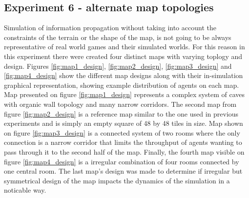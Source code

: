\subsection{Experiment 6 - alternate map topologies}

Simulation of information propagation without taking into account the constraints of the terrain or the shape of the map, is not going to be always representative of real world games and their simulated worlds.
For this reason in this experiment there were created four distinct maps with varying toplogy and design.
Figures \ref{fig:map1_design}, \ref{fig:map2_design}, \ref{fig:map3_design} and \ref{fig:map4_design} show the different map designs along with their in-simulation graphical representation, showing example distribution of agents on each map.
Map presented on figure \ref{fig:map1_design} represents a complex system of caves with organic wall topology and many narrow corridors.
The second map from figure \ref{fig:map2_design} is a reference map similar to the one used in previous experiments and is simply an empty square of 48 by 48 tiles in size.
Map shown on figure \ref{fig:map3_design} is a connected system of two rooms where the only connection is a narrow corridor that limits the throughput of agents wanting to pass through it to the second half of the map.
Finally, the fourth map visible on figure \ref{fig:map4_design} is a irregular combination of four rooms connected by one central room.
The last map's design was made to determine if irregular but symmetrical design of the map impacts the dynamics of the simulation in a noticable way.

